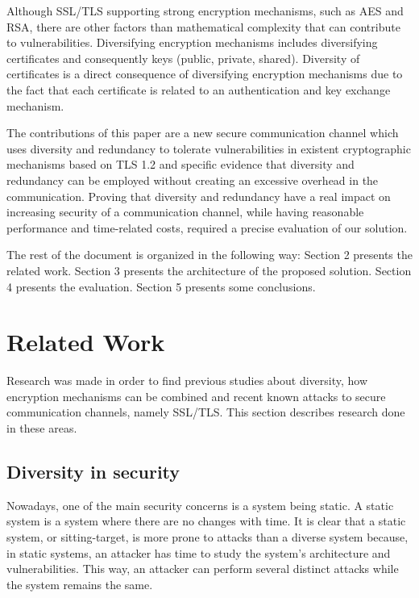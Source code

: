 \documentclass{sig-alternate-05-2015}
\begin{document}
Although SSL/TLS supporting strong encryption mechanisms, such as AES and RSA, there are other factors than mathematical complexity that can contribute to vulnerabilities.
Diversifying encryption mechanisms includes diversifying certificates and consequently keys (public, private, shared).
Diversity of certificates is a direct consequence of diversifying encryption mechanisms due to the fact that each certificate is related to an authentication and key exchange mechanism.

The contributions of this paper are a new secure communication channel which uses diversity and redundancy to tolerate vulnerabilities in existent cryptographic mechanisms based on TLS 1.2 and specific evidence that diversity and redundancy can be employed without creating an excessive overhead in the communication. Proving that diversity and redundancy have a real impact on increasing security of a communication channel, while having reasonable performance and time-related costs, required a precise evaluation of our solution.

The rest of the document is organized in the following way: Section 2 presents the related work. Section 3 presents the architecture of the proposed solution. Section 4 presents the evaluation. Section 5 presents some conclusions.

\section{Related Work}
\label{sec-related-work}

Research was made in order to find previous studies about diversity, how encryption mechanisms can be combined and recent known attacks to secure communication channels, namely SSL/TLS. This section describes research done in these areas.

\subsection{Diversity in security}

Nowadays, one of the main security concerns is a system being static. A static system is a system where there are no changes with time. It is clear that a static system, or sitting-target, is more prone to attacks than a diverse system because, in static systems, an attacker has time to study the system's architecture and vulnerabilities.
This way, an attacker can perform several distinct attacks while the system remains the same.
\end{document}
